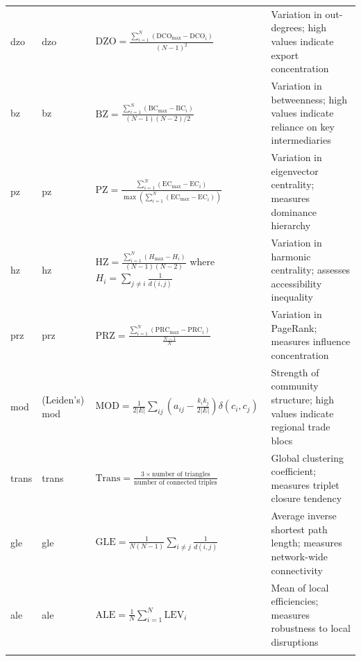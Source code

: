 \documentclass[preprint, 3p,
authoryear]{elsarticle} %
\begin{document}
\begin{longtable}{p{1.2cm}p{3.5cm}p{5.5cm}p{5cm}}
\acrshort{dzo} & \acrlong{dzo} & $\text{DZO} = \frac{\sum_{i=1}^{N} (\text{DCO}_{\max} - \text{DCO}_i)}{(N-1)^2}$ & Variation in out-degrees; high values indicate export concentration \\
\addlinespace

\acrshort{bz} & \acrlong{bz} & $\text{BZ} = \frac{\sum_{i=1}^{N} (\text{BC}_{\max} - \text{BC}_i)}{(N-1)(N-2)/2}$ & Variation in betweenness; high values indicate reliance on key intermediaries \\
\addlinespace

\acrshort{pz} & \acrlong{pz} & $\text{PZ} = \frac{\sum_{i=1}^{N} (\text{EC}_{\max} - \text{EC}_i)}{\max(\sum_{i=1}^{N} (\text{EC}_{\max} - \text{EC}_i))}$ & Variation in eigenvector centrality; measures dominance hierarchy \\
\addlinespace

\acrshort{hz} & \acrlong{hz} & $\text{HZ} = \frac{\sum_{i=1}^{N} (H_{\max} - H_i)}{(N-1)(N-2)}$ where $H_i = \sum_{j \neq i} \frac{1}{d(i,j)}$ & Variation in harmonic centrality; assesses accessibility inequality \\
\addlinespace

\acrshort{prz} & \acrlong{prz} & $\text{PRZ} = \frac{\sum_{i=1}^{N} (\text{PRC}_{\max} - \text{PRC}_i)}{\frac{N-1}{N}}$ & Variation in PageRank; measures influence concentration \\
\addlinespace

\acrshort{mod} & (Leiden's) \acrlong{mod} & $\text{MOD} = \frac{1}{2|E|} \sum_{ij} \left(a_{ij} - \frac{k_i k_j}{2|E|}\right) \delta(c_i, c_j)$ & Strength of community structure; high values indicate regional trade blocs \\
\addlinespace

\acrshort{trans} & \acrlong{trans} & $\text{Trans} = \frac{3 \times \text{number of triangles}}{\text{number of connected triples}}$ & Global clustering coefficient; measures triplet closure tendency \\
\addlinespace

\acrshort{gle} & \acrlong{gle} & $\text{GLE} = \frac{1}{N(N-1)} \sum_{i \neq j} \frac{1}{d(i,j)}$ & Average inverse shortest path length; measures network-wide connectivity \\
\addlinespace

\acrshort{ale} & \acrlong{ale} & $\text{ALE} = \frac{1}{N} \sum_{i=1}^{N} \text{LEV}_i$ & Mean of local efficiencies; measures robustness to local disruptions \\
\addlinespace


\end{longtable}
\end{document}
